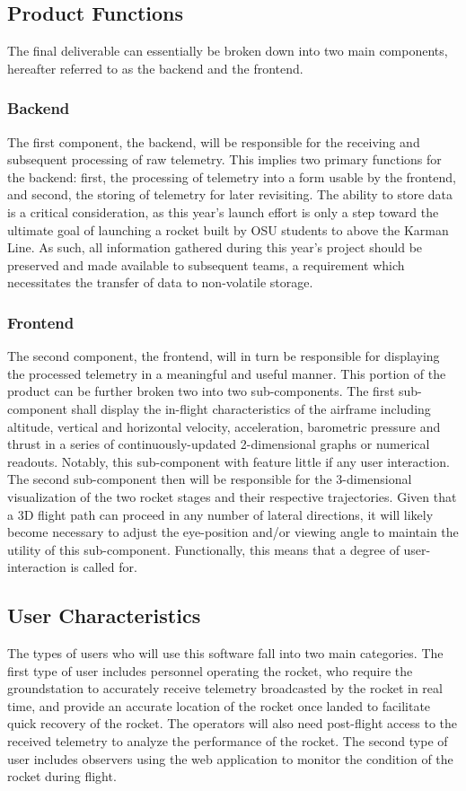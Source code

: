 \documentclass[onecolumn, draftclsnofoot,10pt, compsoc]{IEEEtran}
\begin{document}
		\subsection{Product Functions}
			The final deliverable can essentially be broken down into two main components, hereafter referred to as the backend and the frontend.
			\subsubsection{Backend}
			The first component, the backend, will be responsible for the receiving and subsequent processing of raw telemetry.
			This implies two primary functions for the backend: first, the processing of telemetry into a form usable by the frontend, and second, the storing of telemetry for later revisiting.
			The ability to store data is a critical consideration, as this year's launch effort is only a step toward the ultimate goal of launching a rocket built by OSU students to above the Karman Line.
			As such, all information gathered during this year's project should be preserved and made available to subsequent teams, a requirement which necessitates the transfer of data to non-volatile storage.
			\subsubsection{Frontend}
			The second component, the frontend, will in turn be responsible for displaying the processed telemetry in a meaningful and useful manner.
			This portion of the product can be further broken two into two sub-components.
			The first sub-component shall display the in-flight characteristics of the airframe including altitude, vertical and horizontal velocity, acceleration, barometric pressure and thrust in a series of continuously-updated 2-dimensional graphs or numerical readouts. 
			Notably, this sub-component with feature little if any user interaction. 
			The second sub-component then will be responsible for the 3-dimensional visualization of the two rocket stages and their respective trajectories. 
			Given that a 3D flight path can proceed in any number of lateral directions, it will likely become necessary to adjust the eye-position and/or viewing angle to maintain the utility of this sub-component.
			Functionally, this means that a degree of user-interaction is called for.
			
		\subsection{User Characteristics}
			The types of users who will use this software fall into two main categories. 
			The first type of user includes personnel operating the rocket, who require the groundstation to accurately receive telemetry broadcasted by the rocket in real time, and provide an accurate location of the rocket once landed to facilitate quick recovery of the rocket.
			The operators will also need post-flight access to the received telemetry to analyze the performance of the rocket.
			The second type of user includes observers using the web application to monitor the condition of the rocket during flight.
\end{document}
